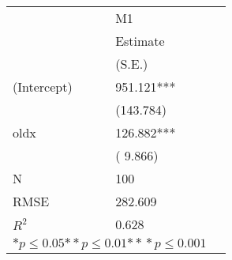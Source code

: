 \begin{tabular}{@{}l*{2}{l}@{}}
\hline
  &\multicolumn{1}{l}{M1  }\tabularnewline
 &\multicolumn{1}{l}{Estimate}\tabularnewline
 &\multicolumn{1}{l}{(S.E.)}\tabularnewline
 \hline
 \hline
  (Intercept) & 951.121*** \tabularnewline
 &(143.784)\tabularnewline
  oldx & 126.882*** \tabularnewline
 &(  9.866)\tabularnewline
 \hline
 N&\multicolumn{1}{l}{100} \tabularnewline
 RMSE&282.609\tabularnewline
 $R^2$&0.628\tabularnewline
 \hline
\hline
 
 \multicolumn{2}{l}{  ${*  p}\le 0.05$${*\!\!*  p}\le 0.01$${*\!\!*\!\!*  p}\le 0.001$}\tabularnewline
 \end{tabular}